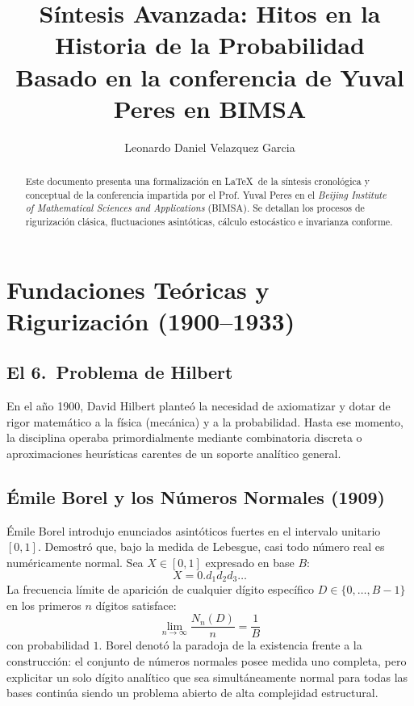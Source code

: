 \documentclass[11pt,a4paper]{article}
\title{Síntesis Avanzada: Hitos en la Historia de la Probabilidad\\ \large Basado en la conferencia de Yuval Peres en BIMSA}
\author{Leonardo Daniel Velazquez Garcia}
\begin{document}
\maketitle

\begin{abstract}
Este documento presenta una formalización en \LaTeX\ de la síntesis cronológica y conceptual de la conferencia impartida por el Prof. Yuval Peres en el \textit{Beijing Institute of Mathematical Sciences and Applications} (BIMSA). Se detallan los procesos de rigurización clásica, fluctuaciones asintóticas, cálculo estocástico e invarianza conforme.
\end{abstract}

\section{Fundaciones Teóricas y Rigurización (1900--1933)}

\subsection{El 6.\textordmasculine\ Problema de Hilbert}
En el año 1900, David Hilbert planteó la necesidad de axiomatizar y dotar de rigor matemático a la física (mecánica) y a la probabilidad. Hasta ese momento, la disciplina operaba primordialmente mediante combinatoria discreta o aproximaciones heurísticas carentes de un soporte analítico general.

\subsection{Émile Borel y los Números Normales (1909)}
Émile Borel introdujo enunciados asintóticos fuertes en el intervalo unitario $[0,1]$. Demostró que, bajo la medida de Lebesgue, casi todo número real es numéricamente normal. Sea $X \in [0,1]$ expresado en base $B$:
\[ X = 0.d_1 d_2 d_3 \dots \]
La frecuencia límite de aparición de cualquier dígito específico $D \in \{0, \dots, B-1\}$ en los primeros $n$ dígitos satisface:
\[ \lim_{n \to \infty} \frac{N_n(D)}{n} = \frac{1}{B} \]
con probabilidad $1$. Borel denotó la paradoja de la existencia frente a la construcción: el conjunto de números normales posee medida uno completa, pero explicitar un solo dígito analítico que sea simultáneamente normal para todas las bases continúa siendo un problema abierto de alta complejidad estructural.
\end{document}
